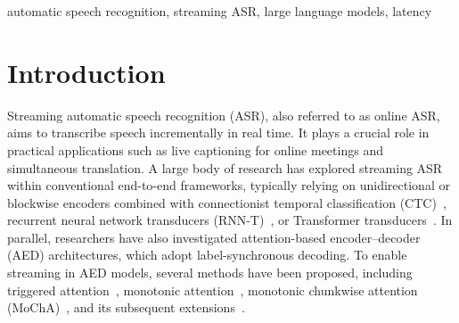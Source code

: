 \documentclass{article}
\begin{document}
\begin{abstract}
Recent advances have demonstrated the potential of decoder-only large language models (LLMs) for automatic speech recognition (ASR). However, enabling streaming recognition within this framework remains a challenge. In this work, we propose a novel streaming ASR approach that integrates a read/write policy network with monotonic chunkwise attention (MoChA) to dynamically segment speech embeddings. These segments are interleaved with label sequences during training, enabling seamless integration with the LLM. During inference, the audio stream is buffered until the MoChA module triggers a read signal, at which point the buffered segment together with the previous token is fed into the LLM for the next token prediction.
We also introduce a minimal-latency training objective to guide the policy network toward accurate segmentation boundaries. Furthermore, we adopt a joint training strategy in which a non-streaming LLM-ASR model and our streaming model share parameters.
Experiments on the AISHELL-1 and AISHELL-2 Mandarin benchmarks demonstrate that our method consistently outperforms recent streaming ASR baselines, achieving character error rates of 5.1\% and 5.5\%, respectively. The latency optimization results in a 62.5\% reduction in average token generation delay with negligible impact on recognition accuracy.



\end{abstract}
%
\begin{keywords}
automatic speech recognition, streaming ASR, large language models, latency
\end{keywords}
%
\section{Introduction}
\label{sec:intro}


Streaming automatic speech recognition (ASR), also referred to as online ASR, aims to transcribe speech incrementally in real time. It plays a crucial role in practical applications such as live captioning for online meetings and simultaneous translation. A large body of research has explored streaming ASR within conventional end-to-end frameworks, typically relying on unidirectional or blockwise encoders combined with connectionist temporal classification (CTC)~\cite{10.1145/1143844.1143891}, recurrent neural network transducers (RNN-T)~\cite{6638947}, or Transformer transducers~\cite{9053896}. 
In parallel, researchers have also investigated attention-based encoder–decoder (AED) architectures, which adopt label-synchronous decoding. To enable streaming in AED models, several methods have been proposed, including triggered attention~\cite{8683510}, monotonic attention~\cite{10.5555/3305890.3305974}, monotonic chunkwise attention (MoChA)~\cite{chiu2018monotonic}, and its subsequent extensions~\cite{arivazhagan-etal-2019-monotonic, inaguma2020enhancing}.
\end{document}
